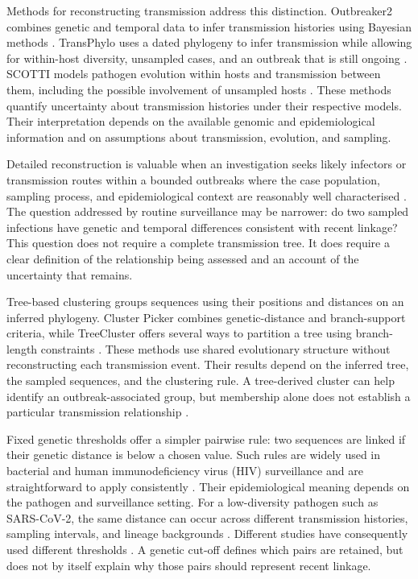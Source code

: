 Methods for reconstructing transmission address this distinction. Outbreaker2 combines genetic and temporal data to infer transmission histories using Bayesian methods \citep{Campbell2018b,Jombart2014}. TransPhylo uses a dated phylogeny to infer transmission while allowing for within-host diversity, unsampled cases, and an outbreak that is still ongoing \citep{Didelot2017}. SCOTTI models pathogen evolution within hosts and transmission between them, including the possible involvement of unsampled hosts \citep{DeMaio2016}. These methods quantify uncertainty about transmission histories under their respective models. Their interpretation depends on the available genomic and epidemiological information and on assumptions about transmission, evolution, and sampling.

Detailed reconstruction is valuable when an investigation seeks likely infectors or transmission routes within a bounded outbreaks where the case population, sampling process, and epidemiological context are reasonably well characterised \citep{Meredith2020,Abbas2022,Duault2022,Campbell2018b}. The question addressed by routine surveillance may be narrower: do two sampled infections have genetic and temporal differences consistent with recent linkage? This question does not require a complete transmission tree. It does require a clear definition of the relationship being assessed and an account of the uncertainty that remains.

Tree-based clustering groups sequences using their positions and distances on an inferred phylogeny. Cluster Picker combines genetic-distance and branch-support criteria, while TreeCluster offers several ways to partition a tree using branch-length constraints \citep{RagonnetCronin2013,Balaban2019}. These methods use shared evolutionary structure without reconstructing each transmission event. Their results depend on the inferred tree, the sampled sequences, and the clustering rule. A tree-derived cluster can help identify an outbreak-associated group, but membership alone does not establish a particular transmission relationship \citep{Bousali2021,Lemieux2021,GomezCarballa2021}.

Fixed genetic thresholds offer a simpler pairwise rule: two sequences are linked if their genetic distance is below a chosen value. Such rules are widely used in bacterial and human immunodeficiency virus (HIV) surveillance and are straightforward to apply consistently \citep{Maiden1998,KosakovskyPond2018}. Their epidemiological meaning depends on the pathogen and surveillance setting. For a low-diversity pathogen such as SARS-CoV-2, the same distance can occur across different transmission histories, sampling intervals, and lineage backgrounds \citep{Poon2016,Sobkowiak2022}. Different studies have consequently used different thresholds \citep{Hare2023}. A genetic cut-off defines which pairs are retained, but does not by itself explain why those pairs should represent recent linkage.

